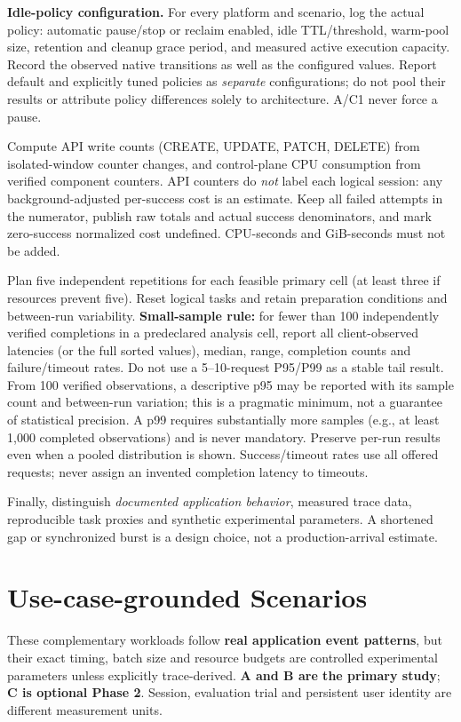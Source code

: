 \documentclass[
  a4paper,
]{article}
\begin{document}
\textbf{Idle-policy configuration.} For every
platform and scenario, log the actual policy:
automatic pause/stop or reclaim enabled,
idle TTL/threshold, warm-pool size, retention
and cleanup grace period, and measured active
execution capacity. Record the observed native
transitions as well as the configured values.
Report default and explicitly tuned policies as
\emph{separate} configurations; do not pool their
results or attribute policy differences solely
to architecture. A/C1 never force a pause.

Compute API write counts (CREATE,
UPDATE, PATCH, DELETE) from
isolated-window counter changes,
and control-plane CPU consumption
from verified component counters.
API counters do \emph{not} label
each logical session: any
background-adjusted per-success
cost is an estimate. Keep all
failed attempts in the numerator,
publish raw totals and actual
success denominators, and mark
zero-success normalized cost
undefined. CPU-seconds and
GiB-seconds must not be added.

Plan five independent repetitions
for each feasible primary cell
(at least three if resources
prevent five). Reset logical
tasks and retain preparation
conditions and between-run
variability. \textbf{Small-sample rule:}
for fewer than 100 independently
verified completions in a
predeclared analysis cell, report
all client-observed latencies
(or the full sorted values),
median, range, completion counts
and failure/timeout rates.
Do not use a 5--10-request
P95/P99 as a stable tail result.
From 100 verified observations,
a descriptive p95 may be
reported with its sample count
and between-run variation; this
is a pragmatic minimum, not
a guarantee of statistical
precision. A p99 requires
substantially more samples
(e.g., at least 1,000
completed observations) and
is never mandatory. Preserve
per-run results even when a
pooled distribution is shown.
Success/timeout rates use
all offered requests; never
assign an invented completion
latency to timeouts.

Finally, distinguish
\emph{documented application
behavior}, measured trace data,
reproducible task proxies and
synthetic experimental parameters.
A shortened gap or synchronized
burst is a design choice, not
a production-arrival estimate.

\section{Use-case-grounded Scenarios}
\label{sec:scenarios}
These complementary workloads follow
\textbf{real application event patterns},
but their exact timing, batch size and
resource budgets are controlled experimental
parameters unless explicitly trace-derived.
\textbf{A and B are the primary study};
\textbf{C is optional Phase 2}.
Session, evaluation trial and persistent
user identity are different measurement units.
\end{document}
